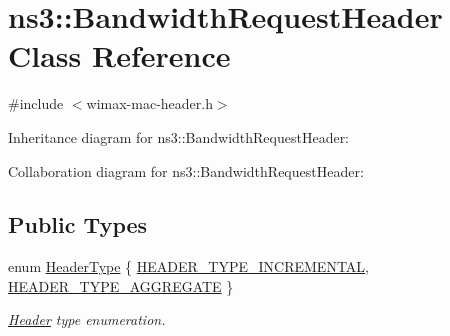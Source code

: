 \hypertarget{classns3_1_1BandwidthRequestHeader}{}\section{ns3\+:\+:Bandwidth\+Request\+Header Class Reference}
\label{classns3_1_1BandwidthRequestHeader}


{\ttfamily \#include $<$wimax-\/mac-\/header.\+h$>$}



Inheritance diagram for ns3\+:\+:Bandwidth\+Request\+Header\+:


Collaboration diagram for ns3\+:\+:Bandwidth\+Request\+Header\+:
\subsection*{Public Types}
\begin{DoxyCompactItemize}
\item 
enum \hyperlink{classns3_1_1BandwidthRequestHeader_abbaf4abd8f160828930369dff9a3d657}{Header\+Type} \{ \hyperlink{classns3_1_1BandwidthRequestHeader_abbaf4abd8f160828930369dff9a3d657aec4eaf7a3d70d48c897447b9ee676b7b}{H\+E\+A\+D\+E\+R\+\_\+\+T\+Y\+P\+E\+\_\+\+I\+N\+C\+R\+E\+M\+E\+N\+T\+AL}, 
\hyperlink{classns3_1_1BandwidthRequestHeader_abbaf4abd8f160828930369dff9a3d657ab6d7315b06d931e9c2db56f749a7d337}{H\+E\+A\+D\+E\+R\+\_\+\+T\+Y\+P\+E\+\_\+\+A\+G\+G\+R\+E\+G\+A\+TE}
 \}\begin{DoxyCompactList}\small\item\em \hyperlink{classns3_1_1Header}{Header} type enumeration. \end{DoxyCompactList}
\end{DoxyCompactItemize}
